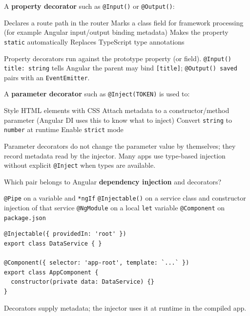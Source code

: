 \question[4]
A \textbf{property decorator} such as \lstinline[style=tsinline]|@Input()| or \lstinline[style=tsinline]|@Output()|:
\begin{choices}
  \choice Declares a route path in the router
  \CorrectChoice Marks a class field for framework processing (for example Angular input/output binding metadata)
  \choice Makes the property \lstinline[style=tsinline]|static| automatically
  \choice Replaces TypeScript type annotations
\end{choices}
\begin{solution}
  Property decorators run against the prototype property (or field). \lstinline[style=tsinline]|@Input() title: string| tells Angular the parent may bind \lstinline[style=htmlinline]|[title]|; \lstinline[style=tsinline]|@Output() saved| pairs with an \lstinline[style=tsinline]|EventEmitter|.
\end{solution}

\question[4]
A \textbf{parameter decorator} such as \lstinline[style=tsinline]|@Inject(TOKEN)| is used to:
\begin{choices}
  \choice Style HTML elements with CSS
  \CorrectChoice Attach metadata to a constructor/method parameter (Angular DI uses this to know what to inject)
  \choice Convert \lstinline[style=tsinline]|string| to \lstinline[style=tsinline]|number| at runtime
  \choice Enable \lstinline[style=tsinline]|strict| mode
\end{choices}
\begin{solution}
  Parameter decorators do not change the parameter value by themselves; they record metadata read by the injector. Many apps use type-based injection without explicit \lstinline[style=tsinline]|@Inject| when types are available.
\end{solution}

\question[4]
Which pair belongs to Angular \textbf{dependency injection} and decorators?
\begin{choices}
  \choice \lstinline[style=tsinline]|@Pipe| on a variable and \lstinline[style=tsinline]|*ngIf|
  \CorrectChoice \lstinline[style=tsinline]|@Injectable()| on a service class and constructor injection of that service
  \choice \lstinline[style=tsinline]|@NgModule| on a local \lstinline[style=tsinline]|let| variable
  \choice \lstinline[style=tsinline]|@Component| on \texttt{package.json}
\end{choices}
\begin{solution}
\begin{lstlisting}[style=ts]
@Injectable({ providedIn: 'root' })
export class DataService { }

@Component({ selector: 'app-root', template: `...` })
export class AppComponent {
  constructor(private data: DataService) {}
}
\end{lstlisting}
  Decorators supply metadata; the injector uses it at runtime in the compiled app.
\end{solution}

